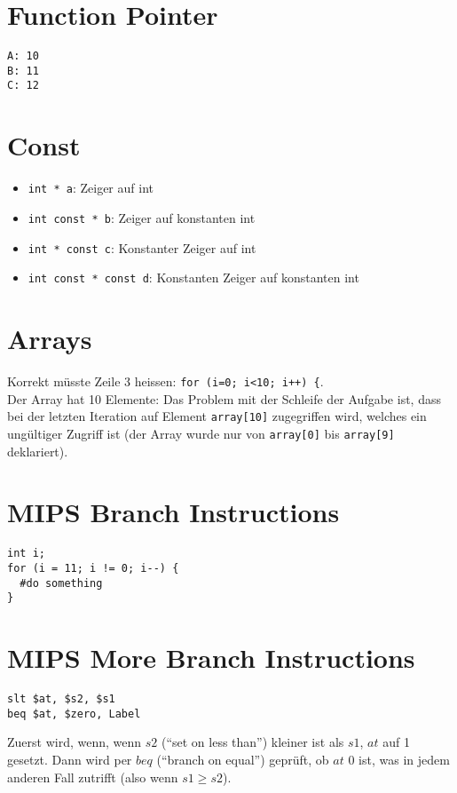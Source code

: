 \documentclass[a4paper,10pt,headlines=3.2]{scrartcl}
\begin{document}
\section{Function Pointer}
\begin{verbatim}
A: 10
B: 11
C: 12
\end{verbatim}

\section{Const}
\begin{itemize}
\item \texttt{int * a}: Zeiger auf int
\item \texttt{int const * b}: Zeiger auf konstanten int
\item \texttt{int * const c}: Konstanter Zeiger auf int
\item \texttt{int const * const d}: Konstanten Zeiger auf konstanten int
\end{itemize}


\section{Arrays}
Korrekt müsste Zeile 3 heissen: \texttt{for (i=0; i<10; i++) \{}.\\
Der Array hat 10 Elemente: Das Problem mit der Schleife der Aufgabe ist, dass bei der letzten Iteration auf Element \texttt{array[10]} zugegriffen wird, welches ein ungültiger Zugriff ist (der Array wurde nur von \texttt{array[0]} bis \texttt{array[9]} deklariert).

\section{MIPS Branch Instructions}
\begin{verbatim}
int i;
for (i = 11; i != 0; i--) {
  #do something
}
\end{verbatim}

\section{MIPS More Branch Instructions}
\begin{verbatim}
slt $at, $s2, $s1
beq $at, $zero, Label
\end{verbatim}
Zuerst wird, wenn, wenn $s2$ (``set on less than'') kleiner ist als $s1$, $at$ auf 1 gesetzt. Dann wird per $beq$ (``branch on equal'') geprüft, ob $at$ 0 ist, was in jedem anderen Fall zutrifft (also wenn $s1 \geq s2$).
\end{document}
